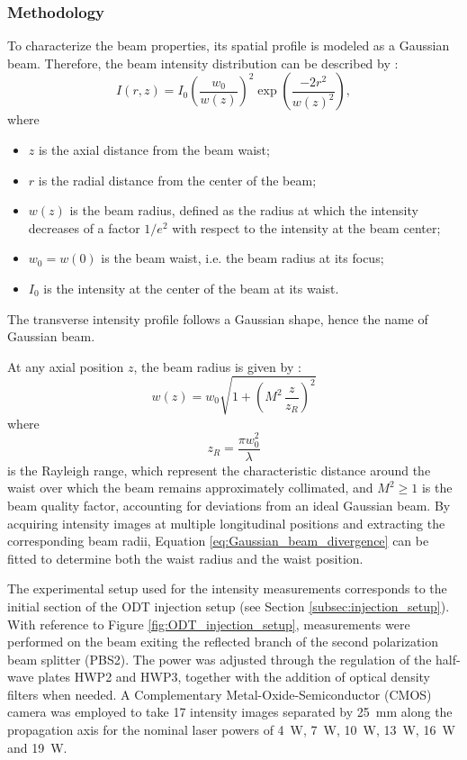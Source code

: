 \subsubsection{Methodology}
To characterize the beam properties, its spatial profile is modeled as a Gaussian beam. Therefore, the beam intensity distribution can be described by \cite{salehteich2019}:
\begin{equation}
    I(r, z) =  I_0 \left( \frac{w_0}{w(z)} \right)^2 \exp \left( \frac{-2r^2}{w(z)^2} \right),
\end{equation}
where 
\begin{itemize}[noitemsep]
    \item $z$ is the axial distance from the beam waist;
    \item $r$ is the radial distance from the center of the beam;
    \item $w(z)$ is the beam radius, defined as the radius at which the intensity decreases of a factor $1/e^2$ with respect to the intensity at the beam center;
    \item $w_0=w(0)$ is the beam waist, i.e. the beam radius at its focus;
    \item $I_0$ is the intensity at the center of the beam at its waist.
\end{itemize}

The transverse intensity profile follows a Gaussian shape, hence the name of Gaussian beam.

At any axial position $z$, the beam radius is given by \cite{salehteich2019}:
\begin{equation}
    \label{eq:Gaussian_beam_divergence}
    w(z) = w_0 \sqrt{1 + \left( M^2\,\frac{z}{z_R} \right)^2}
\end{equation}
where 
\begin{equation}
    \label{eq:Rayleigh_range}
    z_R = \frac{\pi w_0^2}{\lambda}
\end{equation}
is the Rayleigh range, which represent the characteristic distance around the waist over which the beam remains approximately collimated, and $M^2\ge1$ is the beam quality factor, accounting for deviations from an ideal Gaussian beam. By acquiring intensity images at multiple longitudinal positions and extracting the corresponding beam radii, Equation \eqref{eq:Gaussian_beam_divergence} can be fitted to determine both the waist radius and the waist position. 

\vspace{2mm}

The experimental setup used for the intensity measurements corresponds to the initial section of the ODT injection setup (see Section \ref{subsec:injection_setup}). With reference to Figure \ref{fig:ODT_injection_setup}, measurements were performed on the beam exiting the reflected branch of the second polarization beam splitter (PBS2). The power was adjusted through the regulation of the half-wave plates HWP2 and HWP3, together with the addition of optical density filters when needed.
A Complementary Metal-Oxide-Semiconductor (CMOS) camera was employed to take 17 intensity images separated by 25~mm along the propagation axis for the nominal laser powers of 4~W, 7~W, 10~W, 13~W, 16~W and 19~W.

